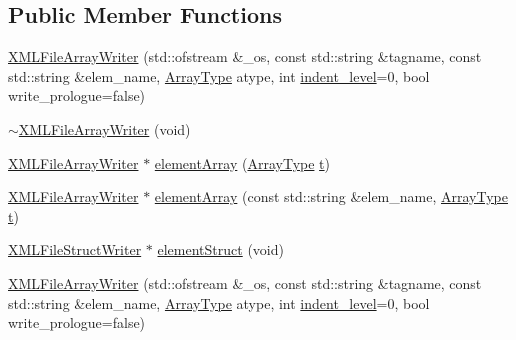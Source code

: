 \subsection*{Public Member Functions}
\begin{DoxyCompactItemize}
\item 
\mbox{\hyperlink{classXMLStructWriterAPI_1_1XMLFileArrayWriter_ab4591c76da7c7db03abe6a3e4cf0529a}{X\+M\+L\+File\+Array\+Writer}} (std\+::ofstream \&\+\_\+os, const std\+::string \&tagname, const std\+::string \&elem\+\_\+name, \mbox{\hyperlink{namespaceXMLStructWriterAPI_a2017208be87c77a32bdc19ea2f14d032}{Array\+Type}} atype, int \mbox{\hyperlink{classXMLStructWriterAPI_1_1XMLArrayWriterBase_ac27f8ee3bc74448bce22008dd40bf8da}{indent\+\_\+level}}=0, bool write\+\_\+prologue=false)
\item 
\mbox{\hyperlink{classXMLStructWriterAPI_1_1XMLFileArrayWriter_acfdbf7c2c12e6cbed700fb0fc48977e7}{$\sim$\+X\+M\+L\+File\+Array\+Writer}} (void)
\item 
\mbox{\hyperlink{classXMLStructWriterAPI_1_1XMLFileArrayWriter}{X\+M\+L\+File\+Array\+Writer}} $\ast$ \mbox{\hyperlink{classXMLStructWriterAPI_1_1XMLFileArrayWriter_afc24054ffb39df378f8aeb77e029bd59}{element\+Array}} (\mbox{\hyperlink{namespaceXMLStructWriterAPI_a2017208be87c77a32bdc19ea2f14d032}{Array\+Type}} \mbox{\hyperlink{adat__devel_2lib_2hadron_2hadron__timeslice_8cc_ac310d9181e916ba43604099aee272c71}{t}})
\item 
\mbox{\hyperlink{classXMLStructWriterAPI_1_1XMLFileArrayWriter}{X\+M\+L\+File\+Array\+Writer}} $\ast$ \mbox{\hyperlink{classXMLStructWriterAPI_1_1XMLFileArrayWriter_ad455da07ae5725cffdab8b056681ec2d}{element\+Array}} (const std\+::string \&elem\+\_\+name, \mbox{\hyperlink{namespaceXMLStructWriterAPI_a2017208be87c77a32bdc19ea2f14d032}{Array\+Type}} \mbox{\hyperlink{adat__devel_2lib_2hadron_2hadron__timeslice_8cc_ac310d9181e916ba43604099aee272c71}{t}})
\item 
\mbox{\hyperlink{classXMLStructWriterAPI_1_1XMLFileStructWriter}{X\+M\+L\+File\+Struct\+Writer}} $\ast$ \mbox{\hyperlink{classXMLStructWriterAPI_1_1XMLFileArrayWriter_aca9a5098cc4549e2001fc148ccb6329e}{element\+Struct}} (void)
\item 
\mbox{\hyperlink{classXMLStructWriterAPI_1_1XMLFileArrayWriter_ab4591c76da7c7db03abe6a3e4cf0529a}{X\+M\+L\+File\+Array\+Writer}} (std\+::ofstream \&\+\_\+os, const std\+::string \&tagname, const std\+::string \&elem\+\_\+name, \mbox{\hyperlink{namespaceXMLStructWriterAPI_a2017208be87c77a32bdc19ea2f14d032}{Array\+Type}} atype, int \mbox{\hyperlink{classXMLStructWriterAPI_1_1XMLArrayWriterBase_ac27f8ee3bc74448bce22008dd40bf8da}{indent\+\_\+level}}=0, bool write\+\_\+prologue=false)

\end{DoxyCompactItemize}
